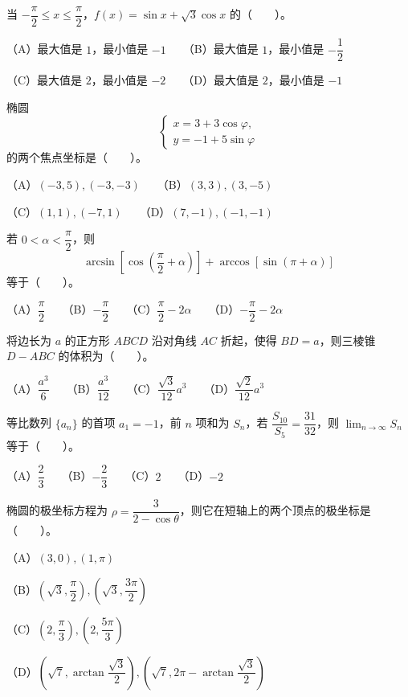 \begin{question}
当 $-\dfrac{\pi}{2}\le x\le\dfrac{\pi}{2}$，$f(x)=\sin x+\sqrt{3}\cos x$ 的\mbox{（　　）}。

（A）最大值是 $1$，最小值是 $-1$　　（B）最大值是 $1$，最小值是 $-\dfrac12$

（C）最大值是 $2$，最小值是 $-2$　　（D）最大值是 $2$，最小值是 $-1$

\end{question}
\begin{question}
椭圆
\nopagebreak[4]
\[
\begin{cases}
x=3+3\cos\varphi,\\
y=-1+5\sin\varphi
\end{cases}
\]
的两个焦点坐标是\mbox{（　　）}。

（A）$(-3,5),(-3,-3)$　　（B）$(3,3),(3,-5)$

（C）$(1,1),(-7,1)$　　（D）$(7,-1),(-1,-1)$

\end{question}
\begin{question}
若 $0<\alpha<\dfrac{\pi}{2}$，则
\nopagebreak[4]
\[
\arcsin\left[\cos\left(\frac{\pi}{2}+\alpha\right)\right]
+\arccos\left[\sin(\pi+\alpha)\right]
\]
等于\mbox{（　　）}。

（A）$\dfrac{\pi}{2}$　　（B）$-\dfrac{\pi}{2}$　　（C）$\dfrac{\pi}{2}-2\alpha$　　（D）$-\dfrac{\pi}{2}-2\alpha$

\end{question}
\begin{question}
将边长为 $a$ 的正方形 $ABCD$ 沿对角线 $AC$ 折起，使得 $BD=a$，则三棱锥 $D-ABC$ 的体积为\mbox{（　　）}。

（A）$\dfrac{a^3}{6}$　　（B）$\dfrac{a^3}{12}$　　（C）$\dfrac{\sqrt{3}}{12}a^3$　　（D）$\dfrac{\sqrt{2}}{12}a^3$

\end{question}
\begin{question}
等比数列 $\{a_n\}$ 的首项 $a_1=-1$，前 $n$ 项和为 $S_n$，若 $\dfrac{S_{10}}{S_5}=\dfrac{31}{32}$，则 $\displaystyle\lim_{n\to\infty}S_n$ 等于\mbox{（　　）}。

（A）$\dfrac23$　　（B）$-\dfrac23$　　（C）$2$　　（D）$-2$

\end{question}
\begin{question}
椭圆的极坐标方程为 $\rho=\dfrac{3}{2-\cos\theta}$，则它在短轴上的两个顶点的极坐标是\mbox{（　　）}。

（A）$(3,0),(1,\pi)$

（B）$\left(\sqrt{3},\dfrac{\pi}{2}\right),\left(\sqrt{3},\dfrac{3\pi}{2}\right)$

（C）$\left(2,\dfrac{\pi}{3}\right),\left(2,\dfrac{5\pi}{3}\right)$

（D）$\left(\sqrt{7},\arctan\dfrac{\sqrt{3}}{2}\right),\left(\sqrt{7},2\pi-\arctan\dfrac{\sqrt{3}}{2}\right)$

\end{question}

